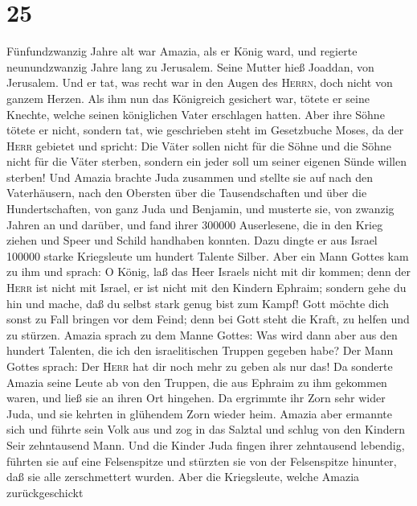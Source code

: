 \hypertarget{section-24}{%
\section{25}\label{section-24}}

 Fünfundzwanzig Jahre alt war Amazia, als er König ward,
und regierte neunundzwanzig Jahre lang zu Jerusalem. Seine Mutter hieß
Joaddan, von Jerusalem.  Und er tat, was recht war in den
Augen des \textsc{Herrn}, doch nicht von ganzem Herzen. 
Als ihm nun das Königreich gesichert war, tötete er seine Knechte,
welche seinen königlichen Vater erschlagen hatten.  Aber
ihre Söhne tötete er nicht, sondern tat, wie geschrieben steht im
Gesetzbuche Moses, da der \textsc{Herr} gebietet und spricht: Die Väter
sollen nicht für die Söhne und die Söhne nicht für die Väter sterben,
sondern ein jeder soll um seiner eigenen Sünde willen sterben!
 Und Amazia brachte Juda zusammen und stellte sie auf nach
den Vaterhäusern, nach den Obersten über die Tausendschaften und über
die Hundertschaften, von ganz Juda und Benjamin, und musterte sie, von
zwanzig Jahren an und darüber, und fand ihrer 300000 Auserlesene, die in
den Krieg ziehen und Speer und Schild handhaben konnten. 
Dazu dingte er aus Israel 100000 starke Kriegsleute um hundert Talente
Silber.  Aber ein Mann Gottes kam zu ihm und sprach: O
König, laß das Heer Israels nicht mit dir kommen; denn der \textsc{Herr}
ist nicht mit Israel, er ist nicht mit den Kindern Ephraim;
 sondern gehe du hin und mache, daß du selbst stark genug
bist zum Kampf! Gott möchte dich sonst zu Fall bringen vor dem Feind;
denn bei Gott steht die Kraft, zu helfen und zu stürzen. 
Amazia sprach zu dem Manne Gottes: Was wird dann aber aus den hundert
Talenten, die ich den israelitischen Truppen gegeben habe? Der Mann
Gottes sprach: Der \textsc{Herr} hat dir noch mehr zu geben als nur das!
 Da sonderte Amazia seine Leute ab von den Truppen, die
aus Ephraim zu ihm gekommen waren, und ließ sie an ihren Ort hingehen.
Da ergrimmte ihr Zorn sehr wider Juda, und sie kehrten in glühendem Zorn
wieder heim.  Amazia aber ermannte sich und führte sein
Volk aus und zog in das Salztal und schlug von den Kindern Seir
zehntausend Mann.  Und die Kinder Juda fingen ihrer
zehntausend lebendig, führten sie auf eine Felsenspitze und stürzten sie
von der Felsenspitze hinunter, daß sie alle zerschmettert wurden.
 Aber die Kriegsleute, welche Amazia zurückgeschickt
